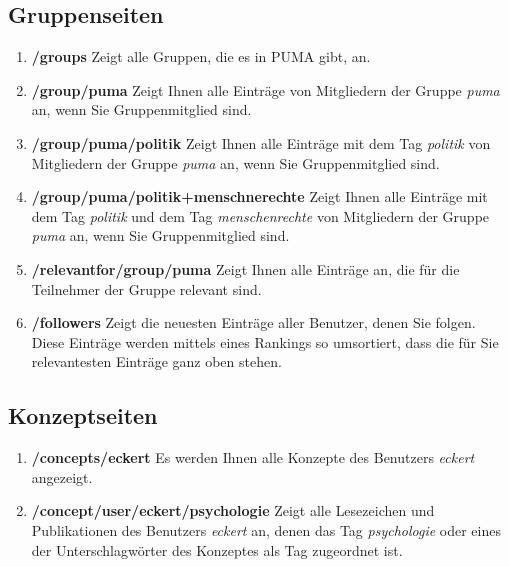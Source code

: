 \subsection{Gruppenseiten}
\label{subsec:gruppenseiten}
\begin{enumerate}
    \item \textbf{/groups} \newline
    Zeigt alle Gruppen, die es in PUMA gibt, an.
    \item \textbf{/group/puma} \newline
    Zeigt Ihnen alle Einträge von Mitgliedern der Gruppe \textit{puma} an, wenn Sie Gruppenmitglied sind.
    \item \textbf{/group/puma/politik}\newline
    Zeigt Ihnen alle Einträge mit dem Tag \textit{politik} von Mitgliedern der Gruppe \textit{puma} an, wenn Sie Gruppenmitglied sind.
    \item \textbf{/group/puma/politik+menschnerechte}\newline
    Zeigt Ihnen alle Einträge mit dem Tag \textit{politik} und dem Tag \textit{menschenrechte} von Mitgliedern der Gruppe \textit{puma} an, wenn Sie Gruppenmitglied sind.
    \item \textbf{/relevantfor/group/puma} \newline
    Zeigt Ihnen alle Einträge an,  die für die Teilnehmer der Gruppe relevant sind.
    \item \textbf{/followers} \newline
    Zeigt die neuesten Einträge aller Benutzer, denen Sie folgen. Diese Einträge werden mittels eines Rankings so umsortiert, dass die für Sie relevantesten Einträge ganz oben stehen. 
\end{enumerate}
\subsection{Konzeptseiten}
\label{subsec:konzeptseiten}
\begin{enumerate}
    \item \textbf{/concepts/eckert} \newline
    Es werden Ihnen alle Konzepte des Benutzers \textit{eckert} angezeigt.
    \item \textbf{/concept/user/eckert/psychologie} \newline
    Zeigt alle Lesezeichen und Publikationen des Benutzers \textit{eckert} an, denen das Tag \textit{psychologie} oder eines der Unterschlagwörter des Konzeptes als Tag zugeordnet ist. 
\end{enumerate}
